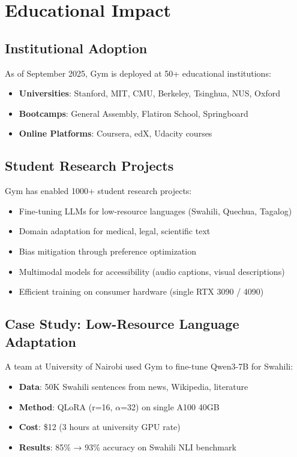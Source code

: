 \section{Educational Impact}


\subsection{Institutional Adoption}

As of September 2025, Gym is deployed at 50+ educational institutions:

\begin{itemize}
\item \textbf{Universities}: Stanford, MIT, CMU, Berkeley, Tsinghua, NUS, Oxford
\item \textbf{Bootcamps}: General Assembly, Flatiron School, Springboard
\item \textbf{Online Platforms}: Coursera, edX, Udacity courses
\end{itemize}

\subsection{Student Research Projects}

Gym has enabled 1000+ student research projects:

\begin{itemize}
\item Fine-tuning LLMs for low-resource languages (Swahili, Quechua, Tagalog)
\item Domain adaptation for medical, legal, scientific text
\item Bias mitigation through preference optimization
\item Multimodal models for accessibility (audio captions, visual descriptions)
\item Efficient training on consumer hardware (single RTX 3090 / 4090)
\end{itemize}

\subsection{Case Study: Low-Resource Language Adaptation}

A team at University of Nairobi used Gym to fine-tune Qwen3-7B for Swahili:

\begin{itemize}
\item \textbf{Data}: 50K Swahili sentences from news, Wikipedia, literature
\item \textbf{Method}: QLoRA (r=16, $\alpha$=32) on single A100 40GB
\item \textbf{Cost}: \$12 (3 hours at university GPU rate)
\item \textbf{Results}: 85\% → 93\% accuracy on Swahili NLI benchmark
\end{itemize}

